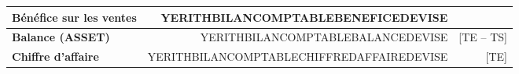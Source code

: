 \documentclass[10pt,YERITHPAPERSPEC,landscape]{article} %
\begin{document}
\vspace*{0.1em}

\begin{table}[!htbp]
\centering
\begin{tabular}{lrr}
\textbf{B\'en\'efice sur les ventes}  &  YERITHBILANCOMPTABLEBENEFICEDEVISE &  \\ \hline
\textbf{Balance (ASSET)}  			  &  YERITHBILANCOMPTABLEBALANCEDEVISE  & [TE -- TS]\\ \hline
\textbf{Chiffre d'affaire}  &  YERITHBILANCOMPTABLECHIFFREDAFFAIREDEVISE  & [TE]\\ 
\end{tabular}
\end{table}

\end{document}
